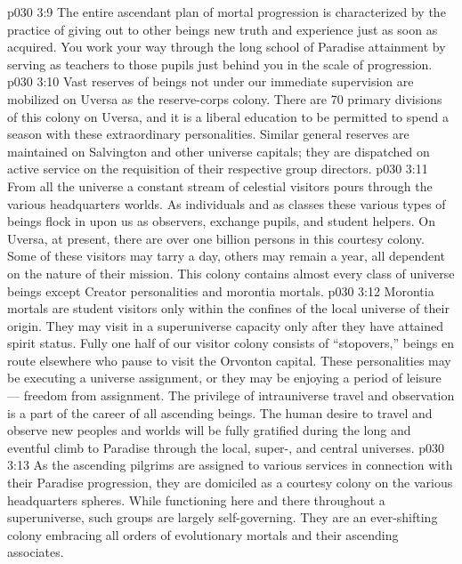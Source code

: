 \vs p030 3:9 The entire ascendant plan of mortal progression is characterized by the practice of giving out to other beings new truth and experience just as soon as acquired. You work your way through the long school of Paradise attainment by serving as teachers to those pupils just behind you in the scale of progression.
\vs p030 3:10 \bibnobreakspace {} Vast reserves of beings not under our immediate supervision are mobilized on Uversa as the reserve\hyp{}corps colony. There are 70 primary divisions of this colony on Uversa, and it is a liberal education to be permitted to spend a season with these extraordinary personalities. Similar general reserves are maintained on Salvington and other universe capitals; they are dispatched on active service on the requisition of their respective group directors.
\vs p030 3:11 \bibnobreakspace {} From all the universe a constant stream of celestial visitors pours through the various headquarters worlds. As individuals and as classes these various types of beings flock in upon us as observers, exchange pupils, and student helpers. On Uversa, at present, there are over one billion persons in this courtesy colony. Some of these visitors may tarry a day, others may remain a year, all dependent on the nature of their mission. This colony contains almost every class of universe beings except Creator personalities and morontia mortals.
\vs p030 3:12 Morontia mortals are student visitors only within the confines of the local universe of their origin. They may visit in a superuniverse capacity only after they have attained spirit status. Fully one half of our visitor colony consists of “stopovers,” beings en route elsewhere who pause to visit the Orvonton capital. These personalities may be executing a universe assignment, or they may be enjoying a period of leisure --- freedom from assignment. The privilege of intrauniverse travel and observation is a part of the career of all ascending beings. The human desire to travel and observe new peoples and worlds will be fully gratified during the long and eventful climb to Paradise through the local, super-, and central universes.
\vs p030 3:13 \bibnobreakspace {} As the ascending pilgrims are assigned to various services in connection with their Paradise progression, they are domiciled as a courtesy colony on the various headquarters spheres. While functioning here and there throughout a superuniverse, such groups are largely self\hyp{}governing. They are an ever\hyp{}shifting colony embracing all orders of evolutionary mortals and their ascending associates.
